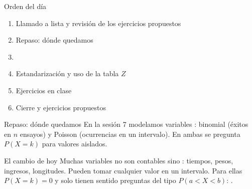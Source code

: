 \documentclass[aspectratio=169,10pt]{beamer}
\begin{document}
\portada

\begin{frame}{Orden del día}
  \begin{enumerate}
    \item Llamado a lista y revisión de los ejercicios propuestos
    \item Repaso: dónde quedamos
    \item {}
    \item Estandarización y uso de la tabla $Z$
    \item Ejercicios en clase
    \item Cierre y ejercicios propuestos
  \end{enumerate}
\end{frame}

\begin{frame}{Repaso: dónde quedamos}
  En la sesión 7 modelamos variables : binomial (éxitos en $n$
  ensayos) y Poisson (ocurrencias en un intervalo). En ambas se pregunta
  $P(X=k)$ para valores aislados.

  \vspace{0.25cm}
  \begin{alertblock}{El cambio de hoy}
    \footnotesize
    Muchas variables no son contables sino : tiempos, pesos,
    ingresos, longitudes. Pueden tomar cualquier valor en un intervalo. Para
    ellas $P(X=k)=0$ y solo tienen sentido preguntas del tipo
    $P(a<X<b)$: .
  \end{alertblock}
\end{frame}

\end{document}
